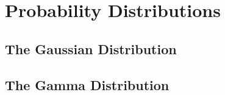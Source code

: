 \chapter{Probability Distributions}
\section{The Gaussian Distribution}

\section{The Gamma Distribution}
